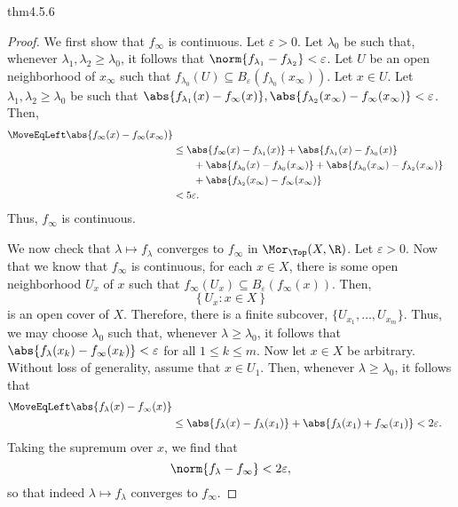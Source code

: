 \begin{thm}{}{thm4.5.6}
\begin{proof}
We first show that $f_\infty$ is continuous.  Let $\varepsilon >0$.  Let $\lambda _0$ be such that, whenever $\lambda _1,\lambda _2\geq \lambda _0$, it follows that $\norm{f_{\lambda _1}-f_{\lambda _2}}<\varepsilon$.  Let $U$ be an open neighborhood of $x_\infty$ such that $f_{\lambda _0}(U)\subseteq B_{\varepsilon}(f_{\lambda _0}(x_\infty ))$.  Let $x\in U$.  Let $\lambda _1,\lambda _2\geq \lambda _0$ be such that $\abs{f_{\lambda _1}(x)-f_\infty (x)},\abs{f_{\lambda _2}(x_\infty )-f_\infty (x_\infty )}<\varepsilon$.  Then,
\begin{equation}
\begin{split}
\MoveEqLeft
\abs{f_\infty (x)-f_\infty (x_\infty )} \\
& \leq \abs{f_\infty (x)-f_{\lambda _1}(x)}+\abs{f_{\lambda _1}(x)-f_{\lambda _0}(x)} \\ & \qquad +\abs{f_{\lambda _0}(x)-f_{\lambda _0}(x_\infty )}+\abs{f_{\lambda _0}(x_\infty )-f_{\lambda _2}(x_\infty )} \\ & \qquad +\abs{f_{\lambda _2}(x_\infty )-f_\infty (x_\infty )} \\
& <5\varepsilon .
\end{split}
\end{equation}
Thus, $f_\infty$ is continuous.

We now check that $\lambda \mapsto f_\lambda$ converges to $f_\infty$ in $\Mor _{\Top}(X,\R )$.  Let $\varepsilon >0$.  Now that we know that $f_\infty$ is continuous, for each $x\in X$, there is some open neighborhood $U_x$ of $x$ such that $f_\infty (U_x)\subseteq B_{\varepsilon}(f_\infty (x))$.  Then, 
\begin{equation}
\left\{ U_x:x\in X\right\} 
\end{equation}
is an open cover of $X$.  Therefore, there is a finite subcover, $\{U_{x_1},\ldots ,U_{x_m}\}$.  Thus, we may choose $\lambda _0$ such that, whenever $\lambda \geq \lambda _0$, it follows that $\abs{f_\lambda (x_k)-f_\infty (x_k)}<\varepsilon$ for all $1\leq k\leq m$.  Now let $x\in X$ be arbitrary.  Without loss of generality, assume that $x\in U_1$.  Then, whenever $\lambda \geq \lambda _0$, it follows that
\begin{equation}
\begin{split}
\MoveEqLeft
\abs{f_\lambda (x)-f_\infty (x)} \\
& \leq \abs{f_\lambda (x)-f_\lambda (x_1)}+\abs{f_\lambda (x_1)+f_\infty (x_1)}<2\varepsilon .
\end{split}
\end{equation}
Taking the supremum over $x$, we find that
\begin{equation}
\norm{f_\lambda -f_\infty }<2\varepsilon ,
\end{equation}
so that indeed $\lambda \mapsto f_\lambda$ converges to $f_\infty$.


\end{proof}
\end{thm}
